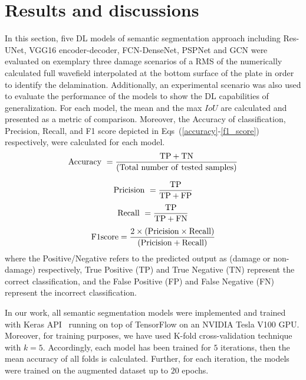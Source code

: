 \section{Results and discussions}
\label{section:results_and_discussions}
In this section, five DL models  of semantic segmentation approach including  Res-UNet, VGG16 encoder-decoder, FCN-DenseNet, PSPNet and GCN were evaluated on exemplary three damage scenarios of a RMS of the numerically calculated full wavefield interpolated at the bottom surface of the plate in order to identify the delamination.
Additionally, an experimental scenario was also used to evaluate the performance of the models to show the DL capabilities of generalization.
For each model, the mean and the max \(IoU\) are calculated and presented as a metric of comparison.
Moreover, the Accuracy of classification, Precision, Recall, and F1 score depicted in Eqs~(\ref{accuracy}-\ref{f1_score}) respectively, were calculated for each model.
\begin{equation}
	\rm Accuracy\ = \frac{TP+TN}{(Total\ number\ of\ tested\ samples)}
	\label{accuracy}
\end{equation}

\begin{equation}
	\rm Pricision\ =\frac{TP}{TP+FP}
	\label{pricisoin}
\end{equation}
\begin{equation}
	\rm Recall\ = \frac{TP}{TP+ FN}
	\label{recall}
\end{equation}
\begin{equation}
	\rm F1 score =\frac{2 \times (Pricision\times Recall)}{(Pricision + Recall)} 
	\label{f1_score}
\end{equation}
where the Positive/Negative refers to the predicted output as (damage or non-damage) respectively, True Positive (TP) and True Negative (TN)  represent the correct classification, and the False Positive (FP) and False Negative (FN) represent the incorrect classification.

In our work, all semantic segmentation models were implemented and trained with Keras API~\cite{chollet2015keras} running on top of TensorFlow on an NVIDIA Tesla V100 GPU. 
Moreover, for training purposes, we have used K-fold cross-validation technique with \(k=5\). 
Accordingly, each model has been trained for \(5\) iterations, then the mean accuracy of all folds is calculated. 
Further, for each iteration, the models were trained on the augmented dataset up to \(20\) epochs.

